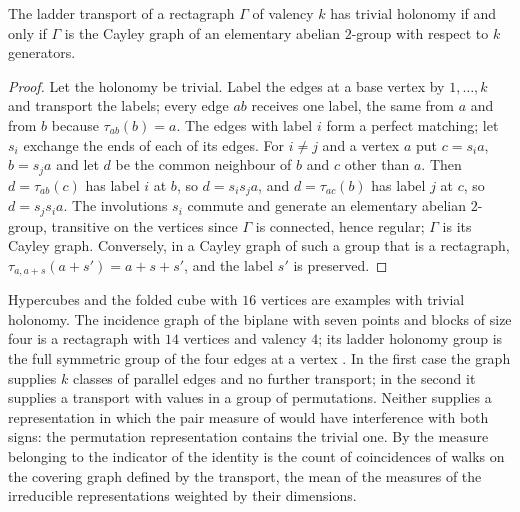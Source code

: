 \begin{proposition}\label{prop:ladder}
The ladder transport of a rectagraph $\Gamma$ of valency $k$ has trivial holonomy if and only if $\Gamma$ is the Cayley graph of an elementary abelian $2$-group with respect to $k$ generators.
\end{proposition}
\begin{proof}
Let the holonomy be trivial. Label the edges at a base vertex by $1,\dots,k$ and transport the labels; every edge $ab$ receives one label, the same from $a$ and from $b$ because $\tau_{ab}(b)=a$. The edges with label $i$ form a perfect matching; let $s_i$ exchange the ends of each of its edges. For $i\ne j$ and a vertex $a$ put $c=s_ia$, $b=s_ja$ and let $d$ be the common neighbour of $b$ and $c$ other than $a$. Then $d=\tau_{ab}(c)$ has label $i$ at $b$, so $d=s_is_ja$, and $d=\tau_{ac}(b)$ has label $j$ at $c$, so $d=s_js_ia$. The involutions $s_i$ commute and generate an elementary abelian $2$-group, transitive on the vertices since $\Gamma$ is connected, hence regular; $\Gamma$ is its Cayley graph. Conversely, in a Cayley graph of such a group that is a rectagraph, $\tau_{a,a+s}(a+s')=a+s+s'$, and the label $s'$ is preserved.
\end{proof}

Hypercubes and the folded cube with $16$ vertices are examples with trivial holonomy. The incidence graph of the biplane with seven points and blocks of size four is a rectagraph with $14$ vertices and valency $4$; its ladder holonomy group is the full symmetric group of the four edges at a vertex \cite{comp3}. In the first case the graph supplies $k$ classes of parallel edges and no further transport; in the second it supplies a transport with values in a group of permutations. Neither supplies a representation in which the pair measure of \cite{g8} would have interference with both signs: the permutation representation contains the trivial one. By \cite{g8} the measure belonging to the indicator of the identity is the count of coincidences of walks on the covering graph defined by the transport, the mean of the measures of the irreducible representations weighted by their dimensions.

